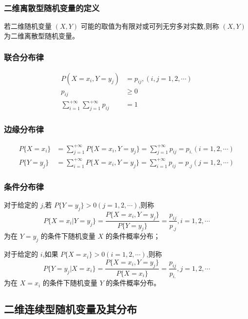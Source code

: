 \documentclass[UTF8]{ctexart}
\theoremstyle{remark}
\begin{document}
		\subsubsection{二维离散型随机变量的定义}
		若二维随机变量 \((X, Y)\) 可能的取值为有限对或可列无穷多对实数,则称 \((X, Y)\) 为二维离散型随机变量。
		
		\subsubsection{联合分布律}
		
		\begin{align*}
			P(X = x_i, Y = y_j) &= p_{ij}, (i, j = 1, 2, \cdots)\\
			p_{ij} &\geq 0\\
			\sum_{i = 1}^{+\infty} \sum_{j = 1}^{+\infty} p_{ij} &= 1
		\end{align*}
		
		
		\subsubsection{边缘分布律}
		
		\begin{align*}
			P\{X = x_i\} &= \sum_{j = 1}^{+\infty} P\{X = x_i, Y = y_j\} = \sum_{j = 1}^{+\infty} p_{ij} = p_{i.} (i = 1, 2, \cdots)\\
			P\{Y = y_j\} &= \sum_{i = 1}^{+\infty} P\{X = x_i, Y = y_j\} = \sum_{i = 1}^{+\infty} p_{ij} = p_{.j} (j = 1, 2, \cdots)
		\end{align*}
		
		\subsubsection{条件分布律}
		对于给定的 \(j\),若 \(P\{Y = y_j\} > 0 (j = 1, 2, \cdots)\),则称
		\[
		P\{X = x_i | Y = y_j\} = \frac{P\{X = x_i, Y = y_j\}}{P\{Y = y_j\}} = \frac{p_{ij}}{p_{.j}}, i = 1, 2, \cdots
		\]
		为在 \(Y = y_j\) 的条件下随机变量 \(X\) 的条件概率分布；
		
		对于给定的 \(i\),如果 \(P\{X = x_i\} > 0 (i = 1, 2, \cdots)\),则称
		\[
		P\{Y = y_j | X = x_i\} = \frac{P\{X = x_i, Y = y_j\}}{P\{X = x_i\}} = \frac{p_{ij}}{p_{i.}}, j = 1, 2, \cdots
		\]
		为在 \(X = x_i\) 的条件下随机变量 \(Y\) 的条件概率分布。
		
		\subsection{二维连续型随机变量及其分布}
\end{document}
